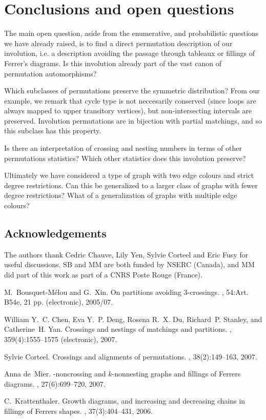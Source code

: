 \documentclass{amsart}
\begin{document}
\section{Conclusions and open questions}
The main open question, aside from the enumerative, and probabilistic questions we have already raised, is to find a direct permutation description of our involution, i.e. a description avoiding the passage through tableaux or fillings of Ferrer's diagrams. Is this involution already part of the vast canon of permutation automorphisms?  

Which subclasses of permutations preserve the symmetric distribution? From our example, we remark that cycle type is not neccesarily conserved (since loops are always mapped to upper transitory vertices), but non-intersecting intervals are preserved. Involution permutations are in bijection with partial matchings, and so this subclass has this property. 

Is there an interpretation of  crossing and nesting numbers in terms of other permutations statistics? Which other statistics does this involution preserve? 

Ultimately we have considered a type of graph with two edge colours and strict degree restrictions. Can this be generalized to a larger class of graphs with fewer degree restrictions?
What of a generalization of graphs with multiple edge colours?

\subsection*{Acknowledgements} The authors thank Cedric Chauve, Lily Yen, Sylvie Corteel and Eric Fusy for useful discussions. SB and MM are both funded by NSERC (Canada), and MM did part of this work as part of a CNRS Poste Rouge (France). 

\begin{thebibliography}{1}
M.~Bousquet-M{\'e}lou and G.~Xin.
\newblock On partitions avoiding 3-crossings.
, 54:Art. B54e, 21 pp. (electronic),
  2005/07.

William Y.~C. Chen, Eva Y.~P. Deng, Rosena R.~X. Du, Richard~P. Stanley, and
  Catherine~H. Yan.
\newblock Crossings and nestings of matchings and partitions.
, 359(4):1555--1575 (electronic), 2007.

Sylvie Corteel.
\newblock Crossings and alignments of permutations.
, 38(2):149--163, 2007.

Anna de~Mier.
-noncrossing and {$k$}-nonnesting graphs and fillings of
  {F}errers diagrams.
, 27(6):699--720, 2007.

C.~Krattenthaler.
\newblock Growth diagrams, and increasing and decreasing chains in fillings of
  {F}errers shapes.
, 37(3):404--431, 2006.

\end{thebibliography}
\end{document}
